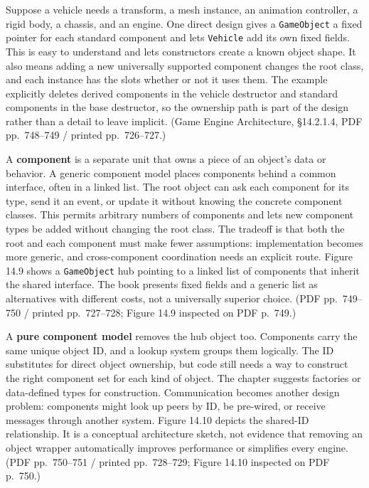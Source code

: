 Suppose a vehicle needs a transform, a mesh instance, an animation controller, a rigid body, a chassis, and an engine. One direct design gives a \texttt{GameObject} a fixed pointer for each standard component and lets \texttt{Vehicle} add its own fixed fields. This is easy to understand and lets constructors create a known object shape. It also means adding a new universally supported component changes the root class, and each instance has the slots whether or not it uses them. The example explicitly deletes derived components in the vehicle destructor and standard components in the base destructor, so the ownership path is part of the design rather than a detail to leave implicit. (Game Engine Architecture, §14.2.1.4, PDF pp.~748--749 / printed pp.~726--727.)

A \textbf{component} is a separate unit that owns a piece of an object's data or behavior. A generic component model places components behind a common interface, often in a linked list. The root object can ask each component for its type, send it an event, or update it without knowing the concrete component classes. This permits arbitrary numbers of components and lets new component types be added without changing the root class. The tradeoff is that both the root and each component must make fewer assumptions: implementation becomes more generic, and cross-component coordination needs an explicit route. Figure 14.9 shows a \texttt{GameObject} hub pointing to a linked list of components that inherit the shared interface. The book presents fixed fields and a generic list as alternatives with different costs, not a universally superior choice. (PDF pp.~749--750 / printed pp.~727--728; Figure 14.9 inspected on PDF p.~749.)

A \textbf{pure component model} removes the hub object too. Components carry the same unique object ID, and a lookup system groups them logically. The ID substitutes for direct object ownership, but code still needs a way to construct the right component set for each kind of object. The chapter suggests factories or data-defined types for construction. Communication becomes another design problem: components might look up peers by ID, be pre-wired, or receive messages through another system. Figure 14.10 depicts the shared-ID relationship. It is a conceptual architecture sketch, not evidence that removing an object wrapper automatically improves performance or simplifies every engine. (PDF pp.~750--751 / printed pp.~728--729; Figure 14.10 inspected on PDF p.~750.)

